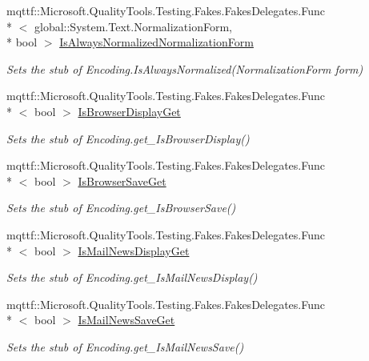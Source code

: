 \begin{DoxyCompactItemize}
mqttf\-::\-Microsoft.\-Quality\-Tools.\-Testing.\-Fakes.\-Fakes\-Delegates.\-Func\\*
$<$ global\-::\-System.\-Text.\-Normalization\-Form, \\*
bool $>$ \hyperlink{class_system_1_1_text_1_1_fakes_1_1_stub_encoding_a90f0e1b4370bdcadac567b26aeb5bcaf}{Is\-Always\-Normalized\-Normalization\-Form}
\begin{DoxyCompactList}\small\item\em Sets the stub of Encoding.\-Is\-Always\-Normalized(\-Normalization\-Form form)\end{DoxyCompactList}\item 
mqttf\-::\-Microsoft.\-Quality\-Tools.\-Testing.\-Fakes.\-Fakes\-Delegates.\-Func\\*
$<$ bool $>$ \hyperlink{class_system_1_1_text_1_1_fakes_1_1_stub_encoding_aae85976aadb6c1f1c8333781575d7b39}{Is\-Browser\-Display\-Get}
\begin{DoxyCompactList}\small\item\em Sets the stub of Encoding.\-get\-\_\-\-Is\-Browser\-Display()\end{DoxyCompactList}\item 
mqttf\-::\-Microsoft.\-Quality\-Tools.\-Testing.\-Fakes.\-Fakes\-Delegates.\-Func\\*
$<$ bool $>$ \hyperlink{class_system_1_1_text_1_1_fakes_1_1_stub_encoding_aa9e858bd947e46256eef32d3f43d25e6}{Is\-Browser\-Save\-Get}
\begin{DoxyCompactList}\small\item\em Sets the stub of Encoding.\-get\-\_\-\-Is\-Browser\-Save()\end{DoxyCompactList}\item 
mqttf\-::\-Microsoft.\-Quality\-Tools.\-Testing.\-Fakes.\-Fakes\-Delegates.\-Func\\*
$<$ bool $>$ \hyperlink{class_system_1_1_text_1_1_fakes_1_1_stub_encoding_afe1778a77114dbafae806636acfd313c}{Is\-Mail\-News\-Display\-Get}
\begin{DoxyCompactList}\small\item\em Sets the stub of Encoding.\-get\-\_\-\-Is\-Mail\-News\-Display()\end{DoxyCompactList}\item 
mqttf\-::\-Microsoft.\-Quality\-Tools.\-Testing.\-Fakes.\-Fakes\-Delegates.\-Func\\*
$<$ bool $>$ \hyperlink{class_system_1_1_text_1_1_fakes_1_1_stub_encoding_ac2d11985c3580f7651f45f0856528eac}{Is\-Mail\-News\-Save\-Get}
\begin{DoxyCompactList}\small\item\em Sets the stub of Encoding.\-get\-\_\-\-Is\-Mail\-News\-Save()\end{DoxyCompactList}\item 

\end{DoxyCompactItemize}
